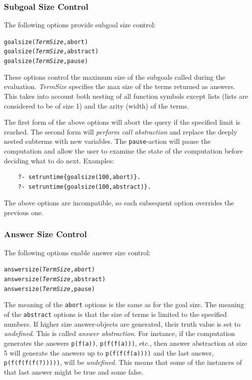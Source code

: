 \documentclass[11pt]{article}
\begin{document}
\subsubsection{Subgoal Size Control}\label{sec-size-control}

The following options provide subgoal size control:
\begin{alltt}
    goalsize(\emph{TermSize},abort)
    goalsize(\emph{TermSize},abstract)
    goalsize(\emph{TermSize},pause)
\end{alltt}
These options control the maximum size of the subgoals called during the
evaluation. \emph{TermSize} specifies the max size of the terms returned as
answers. This takes into account both nesting of all function
symbols except lists (lists are considered to be of size 1) and the arity
(width) of the terms.

The first form of the above options
will abort the
query if the specified limit is reached.
The second form will \emph{perform call abstraction} and replace the
deeply nested subterms with new variables. The \texttt{pause}-action will
pause the computation and allow the user to examine the state of the
computation before deciding what to do next.  Examples:
\begin{verbatim}
    ?- setruntime{goalsize(100,abort)}.
    ?- setruntime{goalsize(100,abstract)}.
\end{verbatim}
The above options are incompatible, so each subsequent option overrides the
previous one.


\subsubsection{Answer Size Control}

The following options enable answer size control:
\begin{alltt}
    answersize(\emph{TermSize},abort)
    answersize(\emph{TermSize},abstract)
    answersize(\emph{TermSize},pause)
\end{alltt}
The meaning of the \texttt{abort} options is the same as
for the goal size.
The meaning of the \texttt{abstract} options is that the size of
terms is limited to the specified numbers. If higher size
answer-objects are generated, their truth value is set to \emph{undefined}. 
This is called \emph{answer abstraction}.  For instance, if the computation
generates the answers \texttt{p(f(a))}, \texttt{p(f(f(a)))}, etc., then
answer abstraction at  size 5 will generate the answers up to
\texttt{p(f(f(f(a))))} and the last answer, \texttt{p(f(f(f(f(?)))))}, will
be \emph{undefined}. This means that some of the instances of that last
answer might be true and some false.
\end{document}
